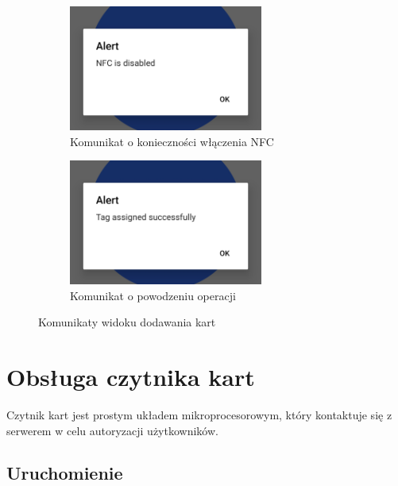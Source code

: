 \begin{figure}[H]
    \centering
    \begin{subfigure}[b]{0.49\textwidth}
        \centering
        \includegraphics[width=0.7\textwidth, frame]{graf/mobile/nfcDisabled.jpg}
        \caption{Komunikat o konieczności włączenia NFC}
        \label{fig:cardNFC}
    \end{subfigure}
    \begin{subfigure}[b]{0.49\textwidth}
        \centering
        \includegraphics[width=0.7\textwidth, frame]{graf/mobile/success.jpg}
        \caption{Komunikat o powodzeniu operacji}
        \label{fig:cardSuccess}
    \end{subfigure}
    \caption{Komunikaty widoku dodawania kart}
\end{figure}

\section{Obsługa czytnika kart}

Czytnik kart jest prostym układem mikroprocesorowym, który kontaktuje się z serwerem w celu autoryzacji użytkowników.

\subsection{Uruchomienie}

